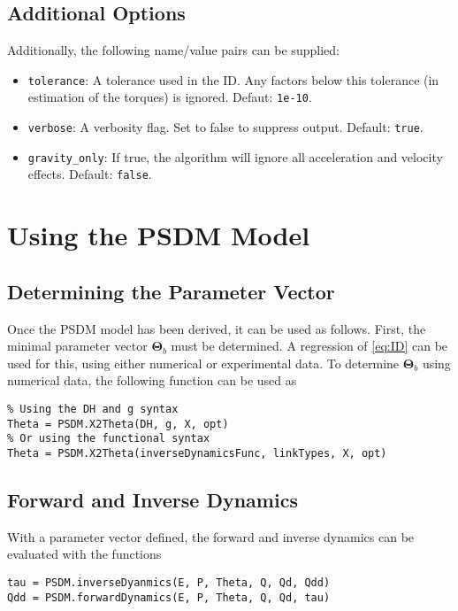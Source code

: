 \documentclass[12pt]{article}
\renewcommand{\b}[1]{\mathbf{#1}}
\begin{document}
\subsection{Additional Options}

Additionally, the following name/value pairs can be supplied:
\begin{itemize}[itemsep=0pt]
	\item \texttt{tolerance}: A tolerance used in the ID. Any factors below this tolerance (in estimation of the torques) is ignored. Defaut: \texttt{1e-10}.
	\item \texttt{verbose}: A verbosity flag. Set to false to suppress output. Default: \texttt{true}.
	\item \texttt{gravity\_only}: If true, the algorithm will ignore all acceleration  and velocity effects. Default: \texttt{false}.
\end{itemize}

\section{Using the PSDM Model}

\subsection{Determining the Parameter Vector}

Once the PSDM model has been derived, it can be used as follows. First, the minimal parameter vector $\b{\Theta}_b$ must be determined. A regression of \cref{eq:ID} can be used for this, using either numerical or experimental data. To determine $\b{\Theta}_b$ using numerical data, the following function can be used as
\begin{lstlisting}
% Using the DH and g syntax
Theta = PSDM.X2Theta(DH, g, X, opt)
% Or using the functional syntax
Theta = PSDM.X2Theta(inverseDynamicsFunc, linkTypes, X, opt)
\end{lstlisting}

\subsection{Forward and Inverse Dynamics}

With a parameter vector defined, the forward and inverse dynamics can be evaluated with the functions
\begin{lstlisting}
tau = PSDM.inverseDyanmics(E, P, Theta, Q, Qd, Qdd)
Qdd = PSDM.forwardDynamics(E, P, Theta, Q, Qd, tau)
\end{lstlisting}
\end{document}

